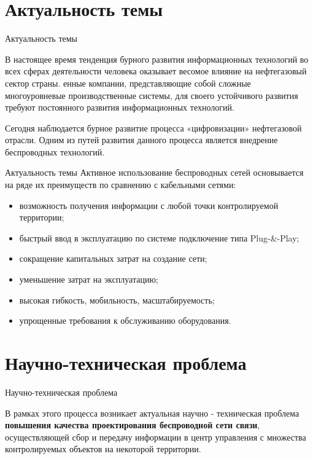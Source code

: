 \section{Актуальность темы}
\begin{frame}
    {Актуальность темы}
    
    В настоящее время тенденция бурного развития информационных технологий во всех сферах деятельности человека оказывает весомое влияние на нефтегазовый сектор страны. енные компании, представляющие собой сложные многоуровневые производственные системы, для своего устойчивого развития требуют постоянного развития информационных технологий.  
    \bigskip

    Сегодня наблюдается  бурное развитие процесса «цифровизации» нефтегазовой отрасли. Одним из путей развития данного процесса является внедрение беспроводных технологий.
    
    
\end{frame}

\begin{frame}
    {Актуальность темы}
    Активное использование беспроводных сетей основывается на ряде их преимуществ по сравнению с кабельными сетями:
    \begin{itemize}
        \item возможность получения информации с любой точки контролируемой территории;
        \item быстрый ввод в эксплуатацию по системе подключение типа Plug-\&-Play;
        \item сокращение капитальных затрат на создание сети; 
        \item уменьшение затрат на эксплуатацию;
        \item высокая гибкость, мобильность, масштабируемость;
        \item упрощенные требования к обслуживанию оборудования.
    \end{itemize}

  
\end{frame}

\section{Научно-техническая проблема}
\begin{frame}
    {Научно-техническая проблема}

    В рамках этого процесса возникает актуальная научно - техническая проблема \textbf{повышения качества проектирования беспроводной сети связи}, осуществляющей сбор и передачу информации в центр  управления с множества контролируемых объектов на некоторой территории. 

\end{frame}


